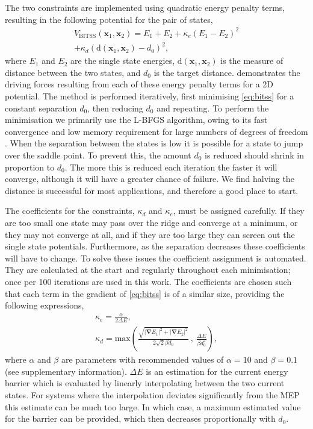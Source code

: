 \documentclass[aps,twocolumn]{revtex4}
\begin{document}
The two constraints are implemented using quadratic energy penalty terms, resulting in the following potential for the pair of states,
\begin{multline}
  V_\text{BITSS}(\bm{x}_1, \bm{x}_2) = E_1 + E_2
    + \kappa_e \left( E_1 - E_2 \right) ^2 \\
    + \kappa_d \left( \mathrm{d}(\bm{x}_1, \bm{x}_2) - d_0 \right) ^2,
  \label{eq:bitss}
\end{multline}
where $E_1$ and $E_2$ are the single state energies, $\mathrm{d}(\bm{x}_1, \bm{x}_2)$ is the measure of distance between the two states, and $d_0$ is the target distance.  demonstrates the driving forces resulting from each of these energy penalty terms for a 2D potential. The method is performed iteratively, first minimising \cref{eq:bitss} for a constant separation $d_0$, then reducing $d_0$ and repeating. To perform the minimisation we primarily use the L-BFGS algorithm, owing to its fast convergence and low memory requirement for large numbers of degrees of freedom \cite{Liu1989}. When the separation between the states is low it is possible for a state to jump over the saddle point. To prevent this, the amount $d_0$ is reduced should shrink in proportion to $d_0$. The more this is reduced each iteration the faster it will converge, although it will have a greater chance of failure. We find halving the distance is successful for most applications, and therefore a good place to start.

The coefficients for the constraints, $\kappa_d$ and $\kappa_e$, must be assigned carefully. If they are too small one state may pass over the ridge and converge at a minimum, or they may not converge at all, and if they are too large they can screen out the single state potentials. Furthermore, as the separation decreases these coefficients will have to change.
To solve these issues the coefficient assignment is automated. They are calculated at the start and regularly throughout each minimisation; once per 100 iterations are used in this work. The coefficients are chosen such that each term in the gradient of \cref{eq:bitss} is of a similar size, providing the following expressions,
\begin{gather}
  \kappa_e = \frac {\alpha} {2 \Delta E},
  \label{eq:ke}
  \\
  \kappa_d = \text{max} \left(
    \frac {\sqrt{|\bm{\nabla} E_1|^2 + |\bm{\nabla} E_2|^2}} {2\sqrt{2} \beta d_0} \ , \ 
    \frac{\Delta E}{\beta d_0^2} \right),
  \label{eq:kd}
\end{gather}
where $\alpha$ and $\beta$ are parameters with recommended values of $\alpha = 10$ and $\beta = 0.1$ (see supplementary information). $\Delta E$ is an estimation for the current energy barrier which is evaluated by linearly interpolating between the two current states. For systems where the interpolation deviates significantly from the MEP this estimate can be much too large. In which case, a maximum estimated value for the barrier can be provided, which then decreases proportionally with $d_0$.
\end{document}
